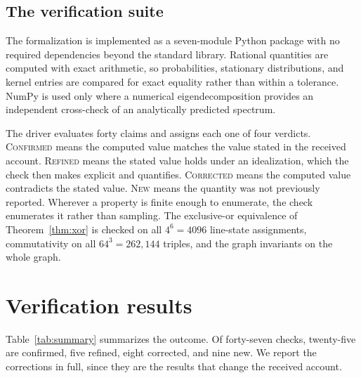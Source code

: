 \documentclass[11pt,a4paper]{article}
\begin{document}
\subsection{The verification suite}
\label{sec:suite}

The formalization is implemented as a seven-module Python package with no
required dependencies beyond the standard library. Rational quantities are
computed with exact arithmetic, so probabilities, stationary distributions, and
kernel entries are compared for exact equality rather than within a tolerance.
NumPy is used only where a numerical eigendecomposition provides an independent
cross-check of an analytically predicted spectrum.

The driver evaluates forty claims and assigns each one of four verdicts.
\textsc{Confirmed} means the computed value matches the value stated in the
received account. \textsc{Refined} means the stated value holds under an
idealization, which the check then makes explicit and quantifies.
\textsc{Corrected} means the computed value contradicts the stated value.
\textsc{New} means the quantity was not previously reported. Wherever a property
is finite enough to enumerate, the check enumerates it rather than sampling. The
exclusive-or equivalence of Theorem~\ref{thm:xor} is checked on all $4^6 = 4096$
line-state assignments, commutativity on all $64^3 = 262{,}144$ triples, and the
graph invariants on the whole graph.

\section{Verification results}
\label{sec:results}

Table~\ref{tab:summary} summarizes the outcome. Of forty-seven checks,
twenty-five are confirmed, five refined, eight corrected, and nine new. We
report the corrections in full, since they are the results that change the
received account.
\end{document}
